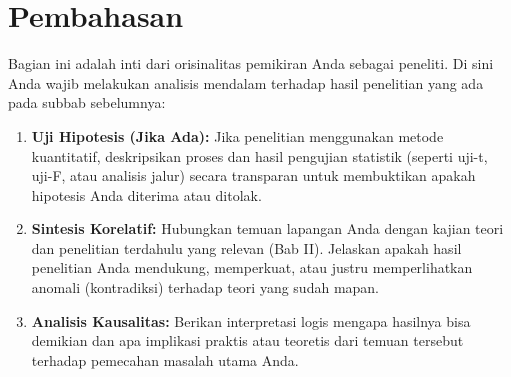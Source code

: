 \section{Pembahasan}

Bagian ini adalah inti dari orisinalitas pemikiran Anda sebagai peneliti. Di sini Anda wajib melakukan analisis mendalam terhadap hasil penelitian yang ada pada subbab sebelumnya:

\begin{enumerate}
	\item \textbf{Uji Hipotesis (Jika Ada):} Jika penelitian menggunakan metode kuantitatif, deskripsikan proses dan hasil pengujian statistik (seperti uji-t, uji-F, atau analisis jalur) secara transparan untuk membuktikan apakah hipotesis Anda diterima atau ditolak.
	\item \textbf{Sintesis Korelatif:} Hubungkan temuan lapangan Anda dengan kajian teori dan penelitian terdahulu yang relevan (Bab II). Jelaskan apakah hasil penelitian Anda mendukung, memperkuat, atau justru memperlihatkan anomali (kontradiksi) terhadap teori yang sudah mapan.
	\item \textbf{Analisis Kausalitas:} Berikan interpretasi logis mengapa hasilnya bisa demikian dan apa implikasi praktis atau teoretis dari temuan tersebut terhadap pemecahan masalah utama Anda.
\end{enumerate}